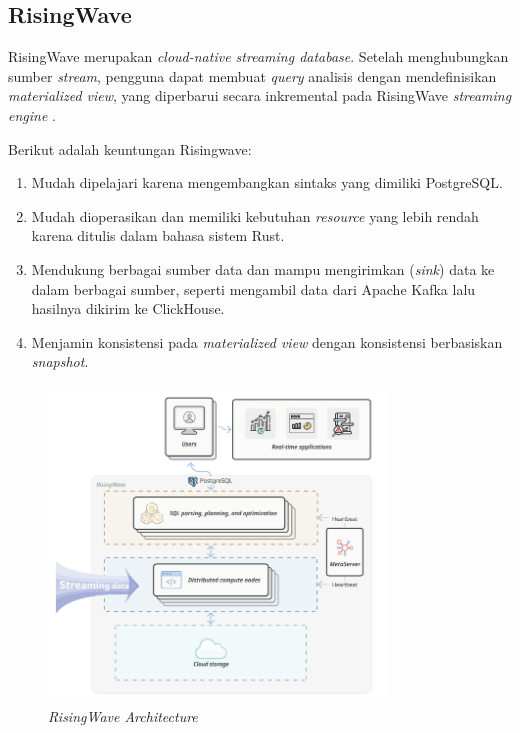 \subsection{RisingWave}

RisingWave merupakan \textit{cloud-native streaming database}. Setelah menghubungkan sumber \textit{stream}, pengguna dapat membuat \textit{query} analisis dengan mendefinisikan \textit{materialized view}, yang diperbarui secara inkremental pada RisingWave \textit{streaming engine} \parencite{risingwave}.

Berikut adalah keuntungan Risingwave:

\begin{enumerate}
    \item Mudah dipelajari karena mengembangkan sintaks yang dimiliki PostgreSQL.
    \item Mudah dioperasikan dan memiliki kebutuhan \textit{resource} yang lebih rendah karena ditulis dalam bahasa sistem Rust.
    \item Mendukung berbagai sumber data dan mampu mengirimkan (\textit{sink}) data ke dalam berbagai sumber, seperti mengambil data dari Apache Kafka lalu hasilnya dikirim ke ClickHouse.
    \item Menjamin konsistensi pada \textit{materialized view} dengan konsistensi berbasiskan \textit{snapshot}.
\end{enumerate}

\begin{figure}[ht]
    \centering
    \includegraphics[width=0.8\textwidth]{resources/chapter-2/risingwave.png}
    \caption{\textit{RisingWave Architecture \parencite{risingwave}}}
    \label{fig:risingwave-architecture}
\end{figure}

